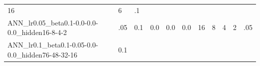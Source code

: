 \documentclass[11pt, a4paper , landscape]{article}
\begin{document}
\begin{longtable}[]{@{}lllllllllll@{}}
\begin{minipage}[t]{0.09\columnwidth}
16\strut
\end{minipage} & \begin{minipage}[t]{0.10\columnwidth}\raggedright\strut
6\strut
\end{minipage} & \begin{minipage}[t]{0.04\columnwidth}\raggedright\strut
.1\strut
\end{minipage}\tabularnewline
\begin{minipage}[t]{0.04\columnwidth}\raggedright\strut
ANN\_lr0.05\_beta0.1-0.0-0.0-0.0\_hidden16-8-4-2\strut
\end{minipage} & \begin{minipage}[t]{0.09\columnwidth}\raggedright\strut
.05\strut
\end{minipage} & \begin{minipage}[t]{0.04\columnwidth}\raggedright\strut
0.1\strut
\end{minipage} & \begin{minipage}[t]{0.05\columnwidth}\raggedright\strut
0.0\strut
\end{minipage} & \begin{minipage}[t]{0.05\columnwidth}\raggedright\strut
0.0\strut
\end{minipage} & \begin{minipage}[t]{0.05\columnwidth}\raggedright\strut
0.0\strut
\end{minipage} & \begin{minipage}[t]{0.09\columnwidth}\raggedright\strut
16\strut
\end{minipage} & \begin{minipage}[t]{0.09\columnwidth}\raggedright\strut
8\strut
\end{minipage} & \begin{minipage}[t]{0.09\columnwidth}\raggedright\strut
4\strut
\end{minipage} & \begin{minipage}[t]{0.10\columnwidth}\raggedright\strut
2\strut
\end{minipage} & \begin{minipage}[t]{0.04\columnwidth}\raggedright\strut
.05\strut
\end{minipage}\tabularnewline
\begin{minipage}[t]{0.04\columnwidth}\raggedright\strut
ANN\_lr0.1\_beta0.1-0.05-0.0-0.0\_hidden76-48-32-16\strut
\end{minipage} & \begin{minipage}[t]{0.09\columnwidth}\raggedright\strut
0.1\strut
\end{minipage} & \begin{minipage}[t]{0.04\columnwidth}\raggedright\strut

\end{minipage}
\end{longtable}
\end{document}
